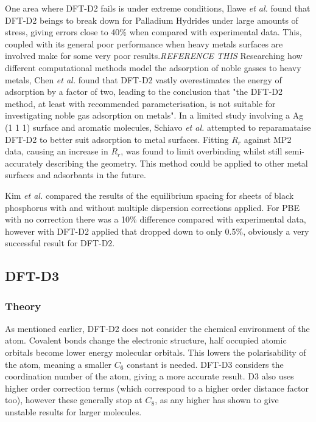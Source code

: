 \documentclass[10pt,a4paper,twocolumn,twoside]{extarticle}
\newcommand{\al}{\emph{et al. }}
\begin{document}
	One area where DFT-D2 fails is under extreme conditions, Ilawe \emph{et al.} found that DFT-D2 beings to break down for Palladium Hydrides under large amounts of stress, giving errors close to 40\% when compared with experimental data.\cite{Ilawe2015} This, coupled with its general poor performance when heavy metals surfaces are involved make for some very poor results.\emph{REFERENCE THIS}
	Researching how different computational methods model the adsorption of noble gasses to heavy metals, Chen \emph{et al.} found that DFT-D2 vastly overestimates the energy of adsorption by a factor of two, leading to the conclusion that "the DFT-D2 method, at least with recommended parameterisation, is not suitable for investigating noble gas adsorption on metals".\cite{Chen2012} 
	In a limited study involving a Ag (1 1 1) surface and aromatic molecules, Schiavo \al attempted to reparamataise DFT-D2 to better suit adsorption to metal surfaces. Fitting $R_r$ against MP2 data, causing an increase in $R_r$, was found to limit overbinding whilst still semi-accurately describing the geometry.\cite{Schiavo2018} This method could be applied to other metal surfaces and adsorbants in the future. 

	Kim \emph{et al.} compared the results of the equilibrium spacing for sheets of black phosphorus with and without multiple dispersion corrections applied. For PBE with no correction there was a 10\% difference compared with experimental data, however with DFT-D2 applied that dropped down to only 0.5\%, obviously a very successful result for DFT-D2.\cite{Kim2014} 

	\subsection{DFT-D3}
	\subsubsection{Theory}
	As mentioned earlier, DFT-D2 does not consider the chemical environment of the atom. Covalent bonds change the electronic structure, half occupied atomic orbitals become lower energy molecular orbitals. This lowers the polarisability of the atom, meaning a smaller $C_6$ constant is needed. DFT-D3 considers the coordination number of the atom, giving a more accurate result. \cite{Grimme2010} D3 also uses higher order correction terms (which correspond to a higher order distance factor too), however these generally stop at $C_8$, as any higher has shown to give unstable results for larger molecules.
\end{document}
